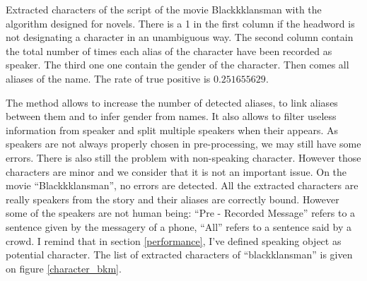 \documentclass[a4paper, 12pt]{report}
\begin{document}
\begin{table}[]
\caption{Extracted characters of the script of the movie Blackkklansman with the algorithm designed for novels. 
There is a 1 in the first column if the headword is not designating a character in an unambiguous way. 
The second column contain the total number of times each alias of the character have been recorded as speaker. 
The third one one contain the gender of the character. Then comes all aliases of the name. The rate of true positive is $0.251655629$.}
 \label{bkk_nov}
\end{table}

The method allows to increase the number of detected aliases, to link aliases between them and to infer gender from names. 
It also allows to filter useless information from speaker and split multiple speakers when their appears. 
As speakers are not always properly chosen in pre-processing, we may still have some errors. 
There is also still the problem with non-speaking character. However those characters are minor and we consider that it is not an important issue. 
 On the movie ``Blackkklansman'', no errors are detected. All the extracted characters are really speakers from the story and their aliases are correctly bound. 
 However some of the speakers are not human being: ``Pre - Recorded Message'' refers to a sentence given by the messagery of a phone, 
 ``All'' refers to a sentence said by a crowd. I remind that in section \ref{performance}, I've defined speaking object as potential character. 
 The list of extracted characters of ``blackklansman'' is given on figure \ref{character_bkm}.\\
\end{document}
